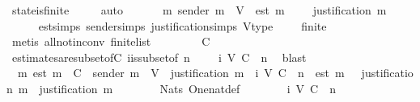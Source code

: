 \begin{isabellebody}
\ state{\isacharunderscore}is{\isacharunderscore}finite\ {\isacartoucheopen}{\isasymsigma}\ {\isasymin}\ {\isasymSigma}{\isacartoucheclose}\ \isamarkupfalse%
\ auto\isanewline
\ \ \isamarkupfalse%
\ \isamarkupfalse%
\ {\isachardoublequoteopen}{\isasymexists}\ m{\isachardot}\ sender\ m\ {\isasymin}\ V\ {\isasymand}\ est\ m\ {\isasymin}\ {\isasymepsilon}\ {\isasymsigma}\ {\isasymand}\ justification\ m\ {\isacharequal}\ {\isasymsigma}{\isachardoublequoteclose}\isanewline
\ \ \ \ \isamarkupfalse%
\ est{\isachardot}simps\ sender{\isachardot}simps\ justification{\isachardot}simps\ V{\isacharunderscore}type\ {\isacartoucheopen}{\isasymepsilon}\ {\isasymsigma}\ {\isasymnoteq}\ {\isasymemptyset}{\isacartoucheclose}\ {\isacartoucheopen}finite\ {\isasymsigma}{\isacartoucheclose}\isanewline
\ \ \ \ \isamarkupfalse%
\ {\isacharparenleft}metis\ all{\isacharunderscore}not{\isacharunderscore}in{\isacharunderscore}conv\ finite{\isacharunderscore}list{\isacharparenright}\isanewline
\ \ \isamarkupfalse%
\ \isamarkupfalse%
\ {\isachardoublequoteopen}{\isasymepsilon}\ {\isasymsigma}\ {\isasymsubseteq}\ C{\isachardoublequoteclose}\isanewline
\ \ \ \ \isamarkupfalse%
\ estimates{\isacharunderscore}are{\isacharunderscore}subset{\isacharunderscore}of{\isacharunderscore}C\ {\isasymSigma}i{\isacharunderscore}is{\isacharunderscore}subset{\isacharunderscore}of{\isacharunderscore}{\isasymSigma}\ {\isacartoucheopen}n\ {\isasymin}\ {\isasymnat}{\isacartoucheclose}\ {\isacartoucheopen}{\isasymsigma}\ {\isasymin}\ {\isasymSigma}i\ {\isacharparenleft}V{\isacharcomma}\ C{\isacharcomma}\ {\isasymepsilon}{\isacharparenright}\ n{\isacartoucheclose}\ \isamarkupfalse%
\ blast\isanewline
\ \ \isamarkupfalse%
\ \isamarkupfalse%
\ {\isachardoublequoteopen}{\isasymexists}\ m{\isachardot}\ est\ m\ {\isasymin}\ C\ {\isasymand}\ sender\ m\ {\isasymin}\ V\ {\isasymand}\ justification\ m\ {\isasymin}\ {\isasymSigma}i\ {\isacharparenleft}V{\isacharcomma}\ C{\isacharcomma}\ {\isasymepsilon}{\isacharparenright}\ n\ {\isasymand}\ est\ m\ {\isasymin}\ {\isasymepsilon}\ {\isacharparenleft}justification\ m{\isacharparenright}\ {\isasymand}\ justification\ m\ {\isacharequal}\ {\isasymsigma}{\isachardoublequoteclose}\isanewline
\ \ \ \ \isamarkupfalse%
\ Nats{\isacharunderscore}{}\ One{\isacharunderscore}nat{\isacharunderscore}def\isanewline
\ \ \ \ \isamarkupfalse%
\ {\isacartoucheopen}{\isasymsigma}\ {\isasymin}\ {\isasymSigma}i\ {\isacharparenleft}V{\isacharcomma}\ C{\isacharcomma}\ {\isasymepsilon}{\isacharparenright}\ n{\isacartoucheclose}\ \isamarkupfalse%

\end{isabellebody}
